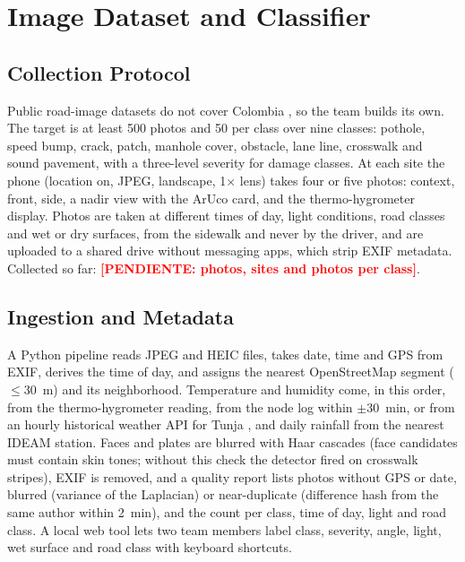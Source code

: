\documentclass[journal,10pt]{IEEEtran}
\newcommand{\pendiente}[1]{\textcolor{red}{\textbf{[PENDIENTE: #1]}}}
\begin{document}
\section{Image Dataset and Classifier}
\label{sec:fotos}
\subsection{Collection Protocol}
Public road-image datasets do not cover Colombia \cite{arya2022rdd}, so the team builds its own. The target is at least 500 photos and 50 per class over nine classes: pothole, speed bump, crack, patch, manhole cover, obstacle, lane line, crosswalk and sound pavement, with a three-level severity for damage classes. At each site the phone (location on, JPEG, landscape, 1\(\times\) lens) takes four or five photos: context, front, side, a nadir view with the ArUco card, and the thermo-hygrometer display. Photos are taken at different times of day, light conditions, road classes and wet or dry surfaces, from the sidewalk and never by the driver, and are uploaded to a shared drive without messaging apps, which strip EXIF metadata. Collected so far: \pendiente{photos, sites and photos per class}.

\subsection{Ingestion and Metadata}
A Python pipeline reads JPEG and HEIC files, takes date, time and GPS from EXIF, derives the time of day, and assigns the nearest OpenStreetMap segment (\(\le 30\)~m) and its neighborhood. Temperature and humidity come, in this order, from the thermo-hygrometer reading, from the node log within \(\pm 30\)~min, or from an hourly historical weather API for Tunja \cite{openmeteo}, and daily rainfall from the nearest IDEAM station. Faces and plates are blurred with Haar cascades \cite{viola2001rapid} (face candidates must contain skin tones; without this check the detector fired on crosswalk stripes), EXIF is removed, and a quality report lists photos without GPS or date, blurred (variance of the Laplacian) or near-duplicate (difference hash from the same author within 2~min), and the count per class, time of day, light and road class. A local web tool lets two team members label class, severity, angle, light, wet surface and road class with keyboard shortcuts.
\end{document}
